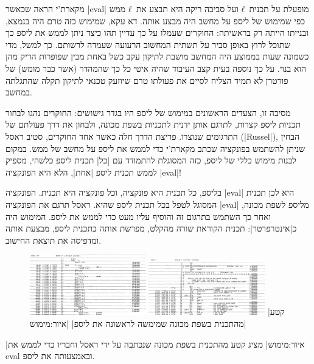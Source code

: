 מקארת'י הראה שכאשר \E|eval| מופעלת על תכנית~$ℓ$ ועל סביבה ריקה היא
תבצע את~$ℓ$ ממש כפי שמימוש של ליספ על מחשב היה מבצע אותה. דא עקא, שמימוש כזה
טרם היה בנמצא, ובנייתו הייתה רק בראשיתה: החוקרים שעמלו על כך עדיין תהו
כיצד ניתן לממש את ליספ כך שתוכל לרוץ באופן סביר על תשתית המחשוב הרעועה שעמדה
לרשותם. כך למשל, מדי כשמונה שעות בממוצע היה המחשב מושבת לתיקון עקב כשל באחת
מבין שפופרות הריק מהן הוא בנוי. על כך נוספה בעית קצב העיבוד שהיה איטי כל כך
שהמהדר (אשר כבר מומש) של פורטרן לא תמיד הצליח לסיים את פעולתו טרם שיוזעק טכנאי
לתיקון תקלה שהתגלתה במחשב.

מסיבה זו, הצעדים הראשונים במימוש של ליספ היו בגדר גישושים: החוקרים נהגו לבחור
תכניות ליספ קצרות, לתרגם אותן ידנית לתכניות בשפת מכונה, ולבחון את דרך פעולתם של
התרגומים שנוצרו. פריצת הדרך חלה כאשר אחד החוקרים, סטיב ראסל (\E|Russel|),
הבחין שניתן להשתמש בפונקציה  שכתב מקארת'י כדי לממש את ליספ על מחשב
של ממש. במקום לבנות מימוש כללי של ליספ, כזה המסוגלת להתמודד עם \ע|כל| תכנית
ליספ כלשהי, מספיק לממש תכנית ליספ \ע|אחת|, הלא היא הפונקציה \E|eval|!

בליספ, כל תכנית היא פונקציה, וכל פונקציה היא תכנית. הפונקציה \E|eval| היא לכן
תכנית המסוגל לטפל בכל תכנית ליספ שהיא. ראסל תרגם את הפונקציה \E|eval| מליספ
לשפת מכונה, ואחר כך השתמש בתרגום זה והוסיף עליו מעט כדי לממש את ליספ. המימוש
היה כ\ע|אינטרפרטר|: תכנית הקוראת שורה מהקלט, מפרשת אותה כתכנית ליספ, מבצעת
אותה ומדפיסה את תוצאת החישוב.

\begin{figure}[H]
\centering
\includegraphics[width=0.45\textwidth]{lisp-assembler2}
\qquad
\includegraphics[width=0.45\textwidth]{lisp-assembler1}
|קטע מהתכנית בשפת מכונה שמימשה לראשונה את ליספ|
|איור:מימוש|
\end{figure}

|איור:מימוש| מציג קטע מהתכנית בשפת מכונה שנכתבה על ידי ראסל וחבריו כדי לממש
את eval ובאמצעותה את ליספ.

